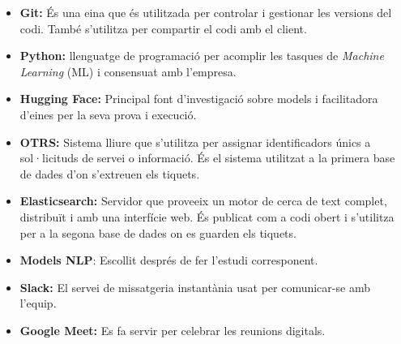 \begin{itemize}
    \item \textbf{Git:} És una eina que és utilitzada per controlar i gestionar les versions del codi. També s'utilitza per compartir el codi amb el client.
    \item \textbf{Python:} llenguatge de programació per acomplir les tasques de \textit{Machine Learning} (ML) i consensuat amb l'empresa.
    \item \textbf{Hugging Face:} Principal font d'investigació sobre models i facilitadora d'eines per la seva prova i execució.
    \item \textbf{OTRS:} Sistema lliure que s'utilitza per assignar identificadors únics a sol·licituds de servei o informació. És el sistema utilitzat a la primera base de dades d'on s'extreuen els tiquets.
    \item \textbf{Elasticsearch:} Servidor que proveeix un motor de cerca de text complet, distribuït i amb una interfície web. És publicat com a codi obert i s'utilitza per a la segona base de dades on es guarden els tiquets.
    \item \textbf{Models NLP\cite{BERT}\cite{RoBERTaA}\cite{GPT2}}: Escollit després de fer l'estudi corresponent.
    \item \textbf{Slack:} El servei de missatgeria instantània usat per comunicar-se amb l'equip.
    \item \textbf{Google Meet:} Es fa servir per celebrar les reunions digitals.
\end{itemize}